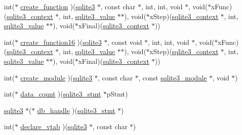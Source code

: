 \begin{DoxyCompactItemize}
int($\ast$ \hyperlink{structsqlite3__api__routines_a9f15bf465292b7176eddbf0287c770f8}{create\+\_\+function} )(\hyperlink{sqlite3_8h_a0ef6f2646262c8a9b24368d8ac140f69}{sqlite3} $\ast$, const char $\ast$, int, int, void $\ast$, void($\ast$x\+Func)(\hyperlink{sqlite3_8h_a3b519553ffec8fc42b2356f5b1ebdc57}{sqlite3\+\_\+context} $\ast$, int, \hyperlink{sqlite3_8h_ac2fa1ecdb2290d9af6010edbd1cbc83c}{sqlite3\+\_\+value} $\ast$$\ast$), void($\ast$x\+Step)(\hyperlink{sqlite3_8h_a3b519553ffec8fc42b2356f5b1ebdc57}{sqlite3\+\_\+context} $\ast$, int, \hyperlink{sqlite3_8h_ac2fa1ecdb2290d9af6010edbd1cbc83c}{sqlite3\+\_\+value} $\ast$$\ast$), void($\ast$x\+Final)(\hyperlink{sqlite3_8h_a3b519553ffec8fc42b2356f5b1ebdc57}{sqlite3\+\_\+context} $\ast$))
\item 
int($\ast$ \hyperlink{structsqlite3__api__routines_a2cb97ce7512759a08f1744e24cd0294f}{create\+\_\+function16} )(\hyperlink{sqlite3_8h_a0ef6f2646262c8a9b24368d8ac140f69}{sqlite3} $\ast$, const void $\ast$, int, int, void $\ast$, void($\ast$x\+Func)(\hyperlink{sqlite3_8h_a3b519553ffec8fc42b2356f5b1ebdc57}{sqlite3\+\_\+context} $\ast$, int, \hyperlink{sqlite3_8h_ac2fa1ecdb2290d9af6010edbd1cbc83c}{sqlite3\+\_\+value} $\ast$$\ast$), void($\ast$x\+Step)(\hyperlink{sqlite3_8h_a3b519553ffec8fc42b2356f5b1ebdc57}{sqlite3\+\_\+context} $\ast$, int, \hyperlink{sqlite3_8h_ac2fa1ecdb2290d9af6010edbd1cbc83c}{sqlite3\+\_\+value} $\ast$$\ast$), void($\ast$x\+Final)(\hyperlink{sqlite3_8h_a3b519553ffec8fc42b2356f5b1ebdc57}{sqlite3\+\_\+context} $\ast$))
\item 
int($\ast$ \hyperlink{structsqlite3__api__routines_a0d2bee02b4c2ce95aa3ae6d4b904bff6}{create\+\_\+module} )(\hyperlink{sqlite3_8h_a0ef6f2646262c8a9b24368d8ac140f69}{sqlite3} $\ast$, const char $\ast$, const \hyperlink{structsqlite3__module}{sqlite3\+\_\+module} $\ast$, void $\ast$)
\item 
int($\ast$ \hyperlink{structsqlite3__api__routines_a4d248c8b990dc7b96c5734ec878508a0}{data\+\_\+count} )(\hyperlink{sqlite3_8h_af2a033da1327cdd77f0a174a09aedd0c}{sqlite3\+\_\+stmt} $\ast$p\+Stmt)
\item 
\hyperlink{sqlite3_8h_a0ef6f2646262c8a9b24368d8ac140f69}{sqlite3} $\ast$($\ast$ \hyperlink{structsqlite3__api__routines_a202912ed0777c34ef98ab262204d0c6e}{db\+\_\+handle} )(\hyperlink{sqlite3_8h_af2a033da1327cdd77f0a174a09aedd0c}{sqlite3\+\_\+stmt} $\ast$)
\item 
int($\ast$ \hyperlink{structsqlite3__api__routines_abe47369f89df1193ca28751e8d024818}{declare\+\_\+vtab} )(\hyperlink{sqlite3_8h_a0ef6f2646262c8a9b24368d8ac140f69}{sqlite3} $\ast$, const char $\ast$)

\end{DoxyCompactItemize}
